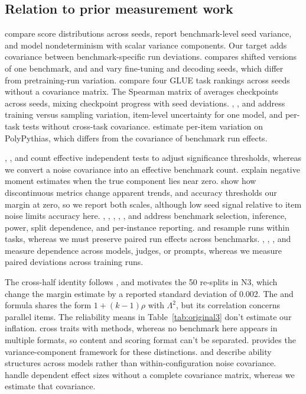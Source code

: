 \subsection{Relation to prior measurement work}
\citet{reimers2017} compare score distributions across seeds, \citet{madaan2024} report benchmark-level seed variance, and \citet{hagmann2023} model nondeterminism with scalar variance components. Our target adds covariance between benchmark-specific run deviations. \citet{jordan2024} compares shifted versions of one benchmark, and \citet{bui2025} and \citet{hochlehnert2025} vary fine-tuning and decoding seeds, which differ from pretraining-run variation. \citet[Section 4.3]{dodge2020} compare four GLUE task rankings across seeds without a covariance matrix. The Spearman matrix of \citet[Figure 3]{zhou2020} averages checkpoints across seeds, mixing checkpoint progress with seed deviations. \citet{dufour2026}, \citet{miller2024}, and \citet{zhao2026} address training versus sampling variation, item-level uncertainty for one model, and per-task tests without cross-task covariance. \citet{haupt2026} estimate per-item variation on PolyPythias, which differs from the covariance of benchmark run effects.

\citet{cheverud2001}, \citet{nyholt2004}, and \citet{li2005} count effective independent tests to adjust significance thresholds, whereas we convert a noise covariance into an effective benchmark count. \citet{searle1992} explain negative moment estimates when the true component lies near zero. \citet{schaeffer2023} show how discontinuous metrics change apparent trends, and accuracy thresholds our margin at zero, so we report both scales, although low seed signal relative to item noise limits accuracy here. \citet{dehghani2021}, \citet{demsar2006}, \citet{dror2017}, \citet{card2020}, \citet{gorman2019}, and \citet{burnell2023} address benchmark selection, inference, power, split dependence, and per-instance reporting. \citet{henderson2018} and \citet{agarwal2021} resample runs within tasks, whereas we must preserve paired run effects across benchmarks. \citet{hardy2026}, \citet{kohli2026}, \citet{messing2026}, and \citet{sha2026} measure dependence across models, judges, or prompts, whereas we measure paired deviations across training runs.

The cross-half identity follows \citet{spearman1904}, and \citet{cronbach1951} motivates the 50 re-splits in N3, which change the margin estimate by a reported standard deviation of 0.002. The \citet{brown1910} and \citet{spearman1910} formula shares the form $1+(k-1)\rho$ with $\Lambda^2$, but its correlation concerns parallel items. The reliability means in Table~\ref{tab:original3} don't estimate our inflation. \citet{campbell1959} cross traits with methods, whereas no benchmark here appears in multiple formats, so content and scoring format can't be separated. \citet{brennan2001} provides the variance-component framework for these distinctions. \citet{hofmann2025} and \citet{kipnis2024} describe ability structures across models rather than within-configuration noise covariance. \citet{hedges2010} handle dependent effect sizes without a complete covariance matrix, whereas we estimate that covariance.
